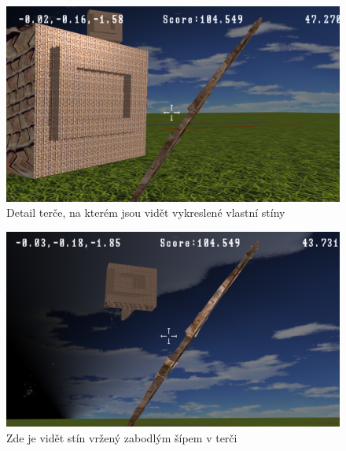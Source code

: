 \begin{figure}
	\begin{center}
			\includegraphics[scale=0.4]{obrazky-figures/24}
		\caption{Detail terče, na kterém jsou vidět vykreslené vlastní stíny}\label{screenShot3}
\end{center}\end{figure}

\begin{figure}
	\begin{center}
		\includegraphics[scale=0.4]{obrazky-figures/27}
		\caption{Zde je vidět stín vržený zabodlým šípem v terči}\label{screenShot4}
\end{center}\end{figure}

